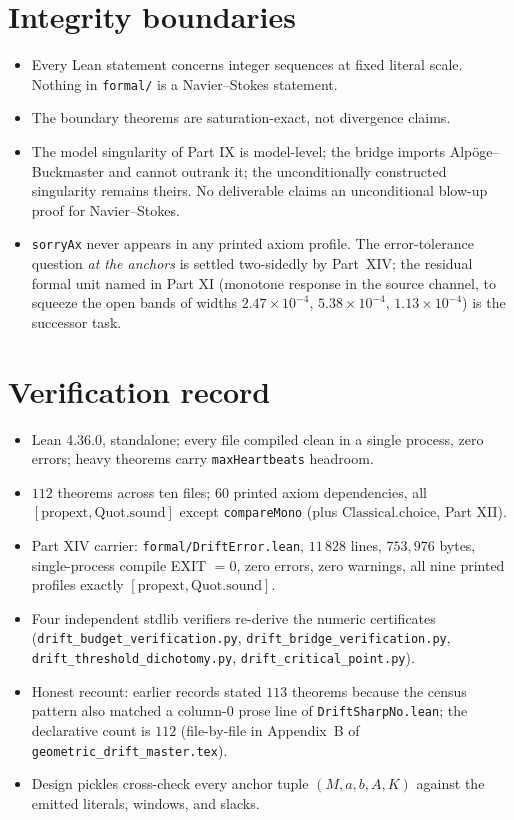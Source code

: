 \documentclass[11pt]{article}
\begin{document}
\section{Integrity boundaries}\label{sec:integrity}

\begin{itemize}
\item Every Lean statement concerns integer sequences at fixed literal scale. Nothing in
\texttt{formal/} is a Navier--Stokes statement.
\item The boundary theorems are saturation-exact, not divergence claims.
\item The model singularity of Part IX is model-level; the bridge imports Alp\"oge--Buckmaster
\cite{blowup} and cannot outrank it; the unconditionally constructed singularity remains
theirs. No deliverable claims an unconditional blow-up proof for Navier--Stokes.
\item \texttt{sorryAx} never appears in any printed axiom profile. The error-tolerance
question \emph{at the anchors} is settled two-sidedly by Part~XIV; the residual formal unit
named in Part XI (monotone response in the source channel, to squeeze the open bands of
widths $2.47\times10^{-4}$, $5.38\times10^{-4}$, $1.13\times10^{-4}$) is the successor task.
\end{itemize}

\section{Verification record}\label{sec:record}

\begin{itemize}
\item Lean 4.36.0, standalone; every file compiled clean in a single process, zero errors;
heavy theorems carry \texttt{maxHeartbeats} headroom.
\item $112$ theorems across ten files; $60$ printed axiom dependencies, all
$[\mathrm{propext},\mathrm{Quot.sound}]$ except \texttt{compareMono}
(plus $\mathrm{Classical.choice}$, Part XII).
\item Part XIV carrier: \texttt{formal/DriftError.lean}, $11\,828$ lines, $753{,}976$ bytes,
single-process compile EXIT $=0$, zero errors, zero warnings, all nine printed profiles
exactly $[\mathrm{propext},\mathrm{Quot.sound}]$.
\item Four independent stdlib verifiers re-derive the numeric certificates
(\texttt{drift\_budget\_verification.py}, \texttt{drift\_bridge\_verification.py},
\texttt{drift\_threshold\_dichotomy.py}, \texttt{drift\_critical\_point.py}).
\item Honest recount: earlier records stated $113$ theorems because the census pattern
also matched a column-0 prose line of \texttt{DriftSharpNo.lean}; the declarative count is
$112$ (file-by-file in Appendix~B of \texttt{geometric\_drift\_master.tex}).
\item Design pickles cross-check every anchor tuple $(M,a,b,A,K)$ against the emitted
literals, windows, and slacks.
\end{itemize}
\end{document}
